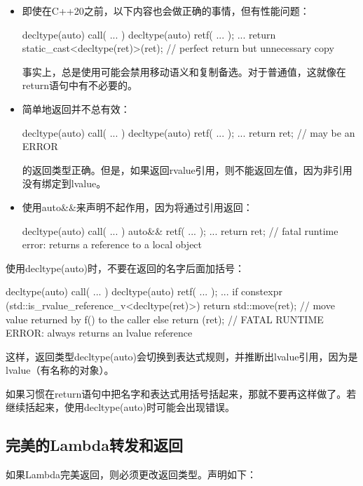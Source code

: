 \begin{itemize}
	\item 即使在C++20之前，以下内容也会做正确的事情，但有性能问题：

\begin{cppcode}
decltype(auto) call( ... )
{
	decltype(auto) ret{f( ... )};
	...
	return static_cast<decltype(ret)>(ret); // perfect return but unnecessary copy
}
\end{cppcode}
事实上，总是使用可能会禁用移动语义和复制备选。对于普通值，这就像在return语句中有不必要的。
\item 简单地返回并不总有效：
\begin{cppcode}
decltype(auto) call( ... )
{
	decltype(auto) ret{f( ... )};
	...
	return ret; // may be an ERROR
}
\end{cppcode}
的返回类型正确。但是，如果返回rvalue引用，则不能返回左值，因为非引用没有绑定到lvalue。
\item 使用auto\&\&来声明不起作用，因为将通过引用返回：
\begin{cppcode}
decltype(auto) call( ... )
{
	auto&& ret{f( ... )};
	...
	return ret; // fatal runtime error: returns a reference to a local object
}
\end{cppcode}
\end{itemize}

使用decltype(auto)时，不要在返回的名字后面加括号：

\begin{cppcode}
decltype(auto) call( ... )
{
	decltype(auto) ret{f( ... )};
	...
	if constexpr (std::is_rvalue_reference_v<decltype(ret)>) {
		return std::move(ret); // move value returned by f() to the caller
	}
	else {
		return (ret); // FATAL RUNTIME ERROR: always returns an lvalue reference
	}
}
\end{cppcode}

这样，返回类型decltype(auto)会切换到表达式规则，并推断出lvalue引用，因为是lvalue（有名称的对象）。

如果习惯在return语句中把名字和表达式用括号括起来，那就不要再这样做了。若继续括起来，使用decltype(auto)时可能会出现错误。

\subsection{完美的Lambda转发和返回}

如果Lambda完美返回，则必须更改返回类型。声明如下：

